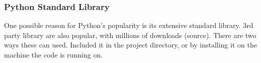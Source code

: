 \documentclass[12pt, titlepage]{article}
\begin{document}
\subsubsection{Python Standard Library}
One possible reason for Python's popularity is its extensive standard library. 3rd party library are also popular, with millions of downloads (source). There are two ways these can used. Included it in the project directory, or by installing it on the machine the code is running on.
\newpage
\end{document}
